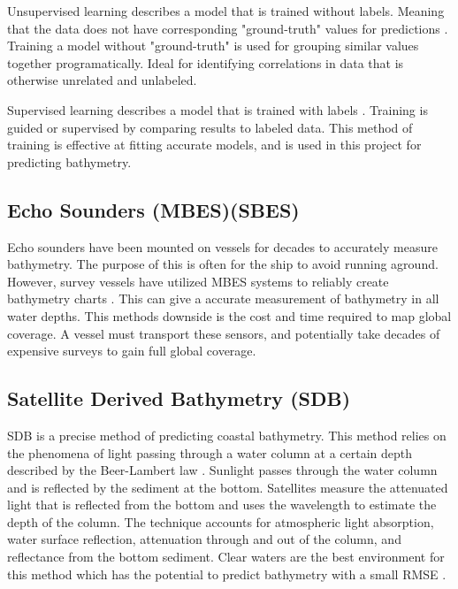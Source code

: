 \par
Unsupervised learning describes a model that is trained without labels.
Meaning that the data does not have corresponding "ground-truth" values for predictions \cite{bishop2006pattern}.
Training a model without "ground-truth" is used for grouping similar values together programatically.
Ideal for identifying correlations in data that is otherwise unrelated and unlabeled.

\par
Supervised learning describes a model that is trained with labels \cite{bishop2006pattern}.
Training is guided or supervised by comparing results to labeled data.
This method of training is effective at fitting accurate models, and is used in this project for predicting bathymetry.



\subsection{Echo Sounders (\ac{MBES})(\ac{SBES}) }
Echo sounders have been mounted on vessels for decades to accurately measure bathymetry.
The purpose of this is often for the ship to avoid running aground.
However, survey vessels have utilized \ac{MBES} systems to reliably create bathymetry charts \cite{farr1980multibeam}.
This can give a accurate measurement of bathymetry in all water depths.
This methods downside is the cost and time required to map global coverage.
A vessel must transport these sensors, and potentially take decades of expensive surveys to gain full global coverage.

\subsection{Satellite Derived Bathymetry (SDB)}
\ac{SDB} is a precise method of predicting coastal bathymetry. 
This method relies on the phenomena of light passing through a water column at a certain depth described by the Beer-Lambert law \cite{chybicki2018three}\cite{vinayaraj2016satellite}.
Sunlight passes through the water column and is reflected by the sediment at the bottom.
Satellites measure the attenuated light that is reflected from the bottom and uses the wavelength to estimate the depth of the column.
The technique accounts for atmospheric light absorption, water surface reflection, attenuation through and out of the column, and reflectance from the bottom sediment.
Clear waters are the best environment for this method which has the potential to predict bathymetry with a small RMSE \cite{chybicki2018three}.


